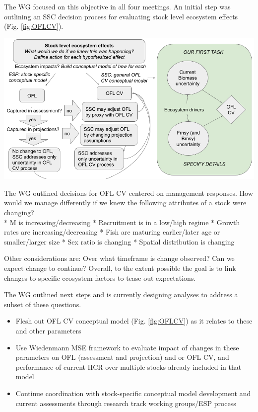 \documentclass[
  10pt,
]{article}
\providecommand{\tightlist}{%
  \setlength{\itemsep}{0pt}\setlength{\parskip}{0pt}}
\let\origfigure\figure
\let\endorigfigure\endfigure
\renewenvironment{figure}[1][2] {
    \expandafter\origfigure\expandafter[H]
} {
    \endorigfigure
}
\begin{document}
The WG focused on this objective in all four meetings. An initial step
was outlining an SSC decision process for evaluating stock level
ecosystem effects (Fig. \ref{fig:OFLCV}).

\begin{figure}

{\centering \includegraphics[width=1\linewidth]{images/OFLCVprocess} 

}

\caption{SSC process for incorporating ecosystem information into OFL CV decisions.}\label{fig:OFLCV}
\end{figure}

The WG outlined decisions for OFL CV centered on management responses.
How would we manage differently if we knew the following attributes of a
stock were changing?\\
* M is increasing/decreasing * Recruitment is in a low/high regime *
Growth rates are increasing/decreasing * Fish are maturing earlier/later
age or smaller/larger size * Sex ratio is changing * Spatial
distribution is changing

Other considerations are: Over what timeframe is change observed? Can we
expect change to continue? Overall, to the extent possible the goal is
to link changes to specific ecosystem factors to tease out expectations.

The WG outlined next steps and is currently designing analyses to
address a subset of these questions.

\begin{itemize}
\tightlist
\item
  Flesh out OFL CV conceptual model (Fig. \ref{fig:OFLCV}) as it relates
  to these and other parameters
\item
  Use Wiedenmann MSE framework to evaluate impact of changes in these
  parameters on OFL (assessment and projection) and or OFL CV, and
  performance of current HCR over multiple stocks already included in
  that model
\item
  Continue coordination with stock-specific conceptual model development
  and current assessments through research track working groups/ESP
  process
\end{itemize}
\end{document}
